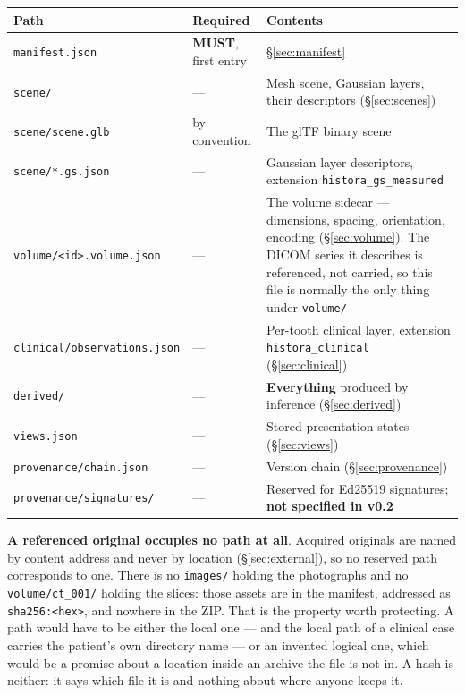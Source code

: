 \documentclass[11pt,a4paper]{article}
\newcommand{\MUST}{\textcolor{uosred}{\textbf{MUST}}}
\newcommand{\code}[1]{\texttt{\small #1}}
\begin{document}
\begin{longtable}{L{5.4cm} L{3.2cm} L{6.2cm}}
\toprule
\textbf{Path} & \textbf{Required} & \textbf{Contents}\\
\midrule
\endhead
\code{manifest.json} & \MUST, first entry & \S\ref{sec:manifest}\\
\code{scene/} & --- & Mesh scene, Gaussian layers, their descriptors (\S\ref{sec:scenes})\\
\code{scene/scene.glb} & by convention & The glTF binary scene\\
\code{scene/*.gs.json} & --- & Gaussian layer descriptors, extension
\code{histora\_gs\_measured}\\
\code{volume/<id>.volume.json} & --- & The volume sidecar --- dimensions, spacing,
orientation, encoding (\S\ref{sec:volume}). The DICOM series it describes is referenced,
not carried, so this file is normally the only thing under \code{volume/}\\
\code{clinical/observations.json} & --- & Per-tooth clinical layer, extension
\code{histora\_clinical} (\S\ref{sec:clinical})\\
\code{derived/} & --- & \textbf{Everything} produced by inference (\S\ref{sec:derived})\\
\code{views.json} & --- & Stored presentation states (\S\ref{sec:views})\\
\code{provenance/chain.json} & --- & Version chain (\S\ref{sec:provenance})\\
\code{provenance/signatures/} & --- & Reserved for Ed25519 signatures; \textbf{not
specified in v0.2}\\
\bottomrule
\end{longtable}

\textbf{A referenced original occupies no path at all}. 
Acquired originals are named by content address and never by location
(\S\ref{sec:external}), so no reserved path corresponds to one. There is no \code{images/}
holding the photographs and no \code{volume/ct\_001/} holding the slices: those assets are
in the manifest, addressed as \code{sha256:<hex>}, and nowhere in the ZIP. That is the property worth protecting. A path would have to be either the local one --- and
the local path of a clinical case carries the patient's own directory name --- or an invented
logical one, which would be a promise about a location inside an archive the file is not in.
A hash is neither: it says which file it is and nothing about where anyone keeps it.
\newline
\end{document}
